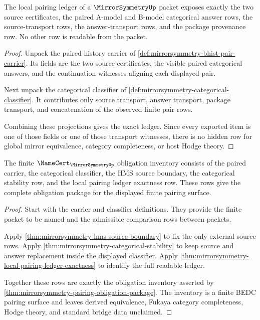 \begin{theorem}
\label{thm:mirrorsymmetry-local-pairing-ledger-exactness}
The local pairing ledger of a $\MirrorSymmetryUp$ packet exposes exactly the
two source certificates, the paired A-model and B-model categorical answer
rows, the source-transport rows, the answer-transport rows, and the package
provenance row. No other row is readable from the packet.
\end{theorem}
\begin{proof}
Unpack the paired history carrier of
\autoref{def:mirrorsymmetry-bhist-pair-carrier}. Its fields are the two source
certificates, the visible paired categorical answers, and the continuation
witnesses aligning each displayed pair.

Next unpack the categorical classifier of
\autoref{def:mirrorsymmetry-categorical-classifier}. It contributes only source
transport, answer transport, package transport, and concatenation of the
observed finite pair rows.

Combining these projections gives the exact ledger. Since every exported item
is one of those fields or one of those transport witnesses, there is no hidden
row for global mirror equivalence, category completeness, or host Hodge theory.
\end{proof}

\begin{theorem}
\label{thm:mirrorsymmetry-namecert-obligation-inventory}
The finite $\NameCert_{\MirrorSymmetryUp}$ obligation inventory consists of
the paired carrier, the categorical classifier, the HMS source boundary, the
categorical stability row, and the local pairing ledger exactness row. These
rows give the complete obligation package for the displayed finite pairing
surface.
\end{theorem}
\begin{proof}
Start with the carrier and classifier definitions. They provide the finite
packet to be named and the admissible comparison rows between packets.

Apply \autoref{thm:mirrorsymmetry-hms-source-boundary} to fix the only external
source rows. Apply \autoref{thm:mirrorsymmetry-categorical-stability} to keep
source and answer replacement inside the displayed classifier. Apply
\autoref{thm:mirrorsymmetry-local-pairing-ledger-exactness} to identify the
full readable ledger.

Together these rows are exactly the obligation inventory asserted by
\autoref{thm:mirrorsymmetry-pairing-obligation-package}. The inventory is a
finite BEDC pairing surface and leaves derived equivalence, Fukaya category
completeness, Hodge theory, and standard bridge data unclaimed.
\end{proof}


